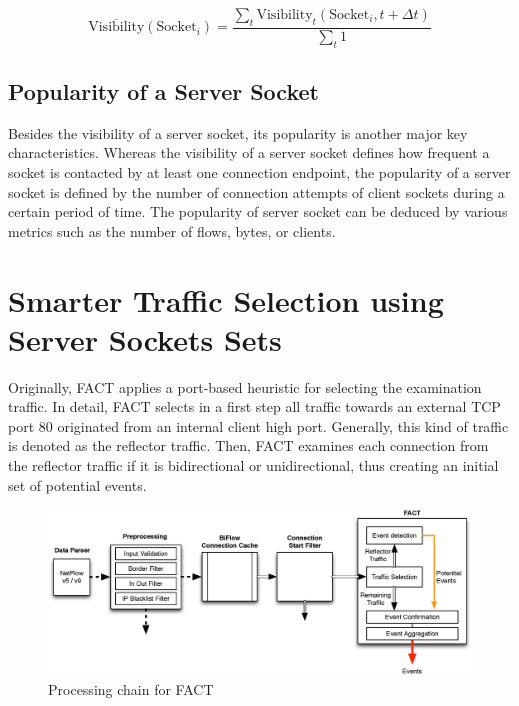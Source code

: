 \begin{equation}
	\overline{\text{Visibility}}(\text{Socket}_i) = \frac{\sum_{t} \text{Visibility}_t(\text{Socket}_i,t+\Delta{t})}{\sum_{t}1}
	\label{eq:visibility_avg}
\end{equation}

\subsection{Popularity of a Server Socket}

Besides the visibility of a \gls{server socket}, its popularity is another major key characteristics. 
Whereas the visibility of a \gls{server socket} defines how frequent a socket is contacted by at least one connection endpoint, the popularity of a \gls{server socket} is defined by the number of connection attempts of client sockets during a certain period of time. 
The popularity of \gls{server socket} can be deduced by various metrics such as the number of flows, bytes, or clients.

\newpage
\section{Smarter Traffic Selection using Server Sockets Sets 
\label{section:ses_traffic_selection}}

Originally, \gls{FACT} applies a port-based heuristic for selecting the  examination traffic.  
In detail, \gls{FACT} selects in a first step all traffic towards an external  \gls{TCP} port 80 originated from an internal client high port. 
Generally, this kind of traffic is denoted as the reflector traffic. 
Then, \gls{FACT} examines each connection from the reflector traffic if it is  bidirectional or unidirectional, thus creating an initial set of potential events. 

\begin{figure}
	[!b] \centering
	\includegraphics[width=\linewidth]{images/FACT.eps}
	\caption{Processing chain for FACT} 
	\label{fig:fact_chain} 
\end{figure}

